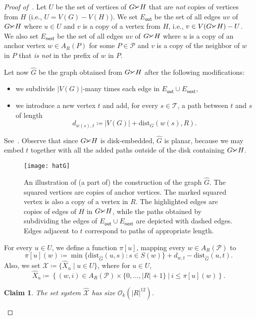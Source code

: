 \documentclass[11pt,a4paper]{article}
\newtheorem{claim}{Claim}[section]
\newcommand{\dist}{\mathrm{dist}}
\renewcommand{\leq}{\leqslant}
\renewcommand{\setminus}{-}
\newcommand{\cutgraph}{\textrm{\CutLeft}}
\begin{document}
\begin{proof}[Proof of~]
  Let $U$ be the set of vertices of $G\cutgraph H$ that are \textsl{not} copies of vertices from $H$ (i.e., $U=V(G)\setminus V(H)$).
  We set $E_{\mathsf{out}}$ be the set of all edges $uv$ of $G\cutgraph H$ where $u\in U$ and $v$ is a copy of a vertex from $H$,
  i.e., $v\in V(G\cutgraph H)\setminus U$.
  We also set $E_{\mathsf{next}}$ be the set of all edges $uv$ of $G\cutgraph H$ where $u$ is a copy
  of an anchor vertex $w\in A_R(P)$ for some $P\in\mathcal{P}$ and $v$ is a copy of the neighbor of $w$
  in $P$ that \textsl{is not} in the prefix of $w$ in $P$.
  
  Let now $\widehat{G}$ be the graph obtained from $G\cutgraph H$ after the following modifications:
  \begin{itemize}[nosep]
    \item we subdivide $|V(G)|$-many times each edge in $E_{\mathsf{out}}\cup E_{\mathsf{next}}$,
    \item we introduce a new vertex $t$ and add, for every $s\in\mathcal{T}$, a path between $t$
    and $s$ of length $$d_{w(s),t}\coloneqq |V(G)| + \dist_G(w(s),R).$$
  \end{itemize}
  See~.
  Observe that since $G\cutgraph H$ is disk-embedded, $\widehat{G}$ is planar,
  because we may embed $t$ together with all the added paths outside of the disk containing $G\cutgraph H$.

  \begin{figure}[ht]
    \centering
    \texttt{[image: hatG]}
    \caption{An illustration of (a part of) the construction of the graph $\widehat{G}$. The squared vertices are copies of anchor vertices. The marked squared vertex is also a copy of a vertex in $R$. The highlighted edges are copies of edges of $H$ in $G\cutgraph H$, while the paths obtained by subdividing the edges of $E_{\mathsf{out}}\cup E_{\mathsf{next}}$ are depicted with dashed edges. Edges adjacent to $t$ correspond to paths of appropriate length.}
    \label{fig:hatG}
  \end{figure}

  For every $u\in U$, we define a function $\pi[u]$, mapping every $w\in A_R(\mathcal{P})$ to
  \[\pi[u](w)\coloneqq\min\{\dist_{\widehat{G}}(u,s): s \in S(w)\}+d_{w,t}-\dist_{\widehat{G}}(u,t).\]
  Also, we set $\widehat{\mathcal{X}}\coloneqq\{\widehat{X}_u\mid u\in U\}$,
  where for $u\in U$,
  $$\widehat{X}_u\coloneqq\left\{(w,i) \in A_R(\mathcal{P}) \times \{0,\ldots,|R|+1\}~|~i \leq \pi[u](w)\right\}.$$

  \begin{claim}\label{cl:vcd}
    The set system $\widehat{\mathcal{X}}$ has size $\mathcal{O}_k(|R|^{12})$.
  \end{claim}


\end{proof}
\end{document}
